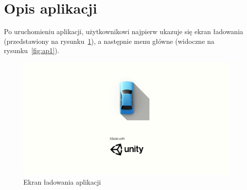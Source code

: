 \chapter*{Opis aplikacji}
Po uruchomieniu aplikacji, użytkownikowi najpierw ukazuje się ekran ładowania (przedstawiony na rysunku~\ref{fig:splash}), a następnie menu główne (widoczne na rysunku~\ref{fig:ap1}).
\begin{figure}[h]
	\centering
	\includegraphics[width=1\linewidth]{splash}
	\caption[Ekran ładowania aplikacji]{Ekran ładowania aplikacji}
	\label{fig:splash}
\end{figure}


